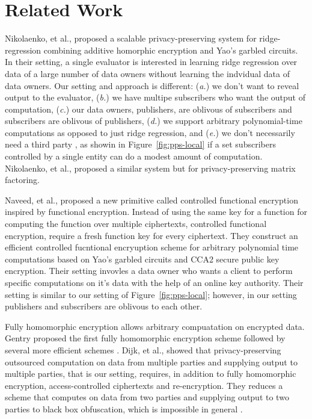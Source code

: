\section{Related Work}
\label{sec:related}

Nikolaenko, et al., \cite{nikolaenko2013privacy} proposed a scalable
privacy-preserving system for ridge-regression combining additive homorphic
encryption and Yao's garbled circuits.  In their setting, a single evaluator is
interested in learning ridge regression over data of a large number of data
owners without learning the indvidual data of data owners. Our setting and
approach is different: (\emph{a.}) we don't want to reveal output to the
evaluator, (\emph{b.}) we have multipe subscribers who want the output of
computation, (\emph{c.}) our data owners, publishers, are oblivous of
subscribers and subscribers are oblivous of publishers, (\emph{d.}) we support
arbitrary polynomial-time computations as opposed to just ridge regression, and
(\emph{e.}) we don't necessarily need a third party \garbler, as showin in
Figure~\ref{fig:pps-local} if a set subscribers controlled by a single entity
can do a modest amount of computation. Nikolaenko, et
al.,\cite{nikolaenko2013privacy} proposed a similar system but for
privacy-preserving matrix factoring.

Naveed, et al., \cite{naveed2014controlled} proposed a new primitive called
controlled functional encryption inspired by functional encryption. Instead of
using the same key for a function for computing the function over multiple
ciphertexts, controlled functional encryption, require a fresh function key for
every ciphertext. They construct an efficient controlled fucntional encryuption
scheme for arbitrary polynomial time computations based on Yao's garbled
circuits and CCA2 secure public key encryption. Their setting invovles a data
owner who wants a client to perform specific computations on it's data with the
help of an online key authority. Their setting is similar to our setting of
Figure~\ref{fig:pps-local}; however, in our setting publishers and subscribers
are oblivous to each other.

Fully homomorphic encryption allows arbitrary compuatation on encrypted data.
Gentry proposed the first fully homomorphic encryption
scheme \cite{brakerski2011fully,gentry2009fully} followed by several more
efficient schemes \cite{brakerski2014leveled}. Dijk, et
al., \cite{van2010impossibility} showed that privacy-preserving outsourced
computation on data from multiple parties and supplying output to multiple
parties, that is our setting, requires, in addition to fully homomorphic
encryption, access-controlled ciphertexts and re-encryption. They reduces a
scheme that computes on data from two parties and supplying output to two
parties to black box obfuscation, which is impossible in
general \cite{barak2001possibility}.

